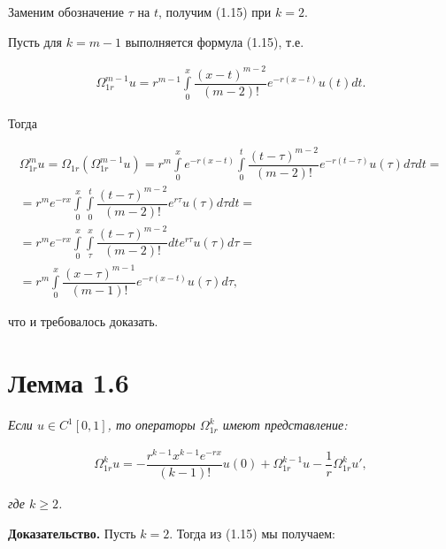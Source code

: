 Заменим обозначение $ \tau $ на $ t $, получим (1.15) при $ k = 2 $. 

Пусть для $ k = m - 1 $ выполняется формула (1.15), т.е.

\begin{equation}
\begin{array}{c}
\nonumber

\Omega_{1r}^{m-1}u = r^{m-1}\int\limits_0^x\dfrac{(x-t)^{m-2}}{(m-2)!}e^{-r(x-t)}u(t)dt.

\end{array}
\end{equation}

Тогда

\begin{equation}
\begin{array}{c}
\nonumber

\Omega_{1r}^mu = \Omega_{1r}(\Omega_{1r}^{m-1}u) = r^m\int\limits_0^x e^{-r(x-t)} \int\limits_0^t\dfrac{(t-\tau)^{m-2}}{(m-2)!}e^{-r(t-\tau)}u(\tau)d\tau dt = \\
= r^me^{-rx}\int\limits_0^x\int\limits_0^t\dfrac{(t-\tau)^{m-2}}{(m-2)!}e^{r\tau}u(\tau)d\tau dt = \\
= r^me^{-rx}\int\limits_0^x\int\limits_\tau^x\dfrac{(t-\tau)^{m-2}}{(m-2)!}dte^{r\tau}u(\tau)d\tau = \\
= r^m\int\limits_0^x\dfrac{(x-\tau)^{m-1}}{(m-1)!}e^{-r(x-t)}u(\tau)d\tau,

\end{array}
\end{equation}

что и требовалось доказать.

\section{Лемма 1.6}
\label{lemma1.6}

\textit{Если $ u \in C^1[0,1] $, то операторы $ \Omega_{1r}^k $ имеют представление:}

\begin{equation}
\begin{array}{c}

\Omega_{1r}^ku = -\dfrac{r^{k-1}x^{k-1}e^{-rx}}{(k-1)!}u(0) + \Omega_{1r}^{k-1}u - \dfrac{1}{r}\Omega_{1r}^ku',

\end{array}
\end{equation}

\textit{где $ k \geq 2 $.}

\textbf{Доказательство.} Пусть $ k = 2 $.  Тогда из (1.15) мы получаем:

